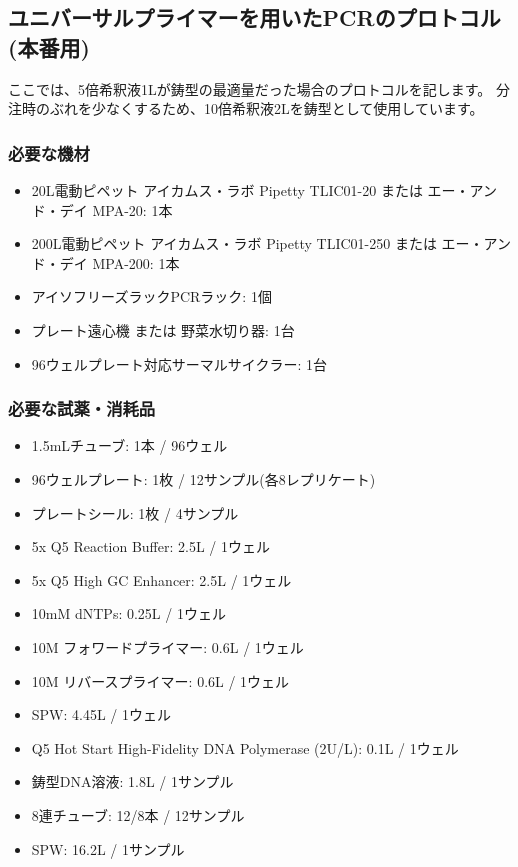 \documentclass[titlepage,10pt,a4paper,uplatex]{jsbook}
\begin{document}
\subsection{ユニバーサルプライマーを用いたPCRのプロトコル (本番用)}

ここでは、5倍希釈液1{\textmu}Lが鋳型の最適量だった場合のプロトコルを記します。
分注時のぶれを少なくするため、10倍希釈液2{\textmu}Lを鋳型として使用しています。

\subsubsection{必要な機材}
\begin{itemize}
\item 20{\textmu}L電動ピペット アイカムス・ラボ Pipetty TLIC01-20 または エー・アンド・デイ MPA-20: 1本
\item 200{\textmu}L電動ピペット アイカムス・ラボ Pipetty TLIC01-250 または エー・アンド・デイ MPA-200: 1本
\item アイソフリーズラックPCRラック: 1個
\item プレート遠心機 または 野菜水切り器: 1台
\item 96ウェルプレート対応サーマルサイクラー: 1台
\end{itemize}

\subsubsection{必要な試薬・消耗品}
\begin{itemize}
\item 1.5mLチューブ: 1本 / 96ウェル
\item 96ウェルプレート: 1枚 / 12サンプル(各8レプリケート)
\item プレートシール: 1枚 / 4サンプル
\item 5x Q5 Reaction Buffer: 2.5{\textmu}L / 1ウェル
\item 5x Q5 High GC Enhancer: 2.5{\textmu}L / 1ウェル
\item 10mM dNTPs: 0.25{\textmu}L / 1ウェル
\item 10{\textmu}M フォワードプライマー: 0.6{\textmu}L / 1ウェル
\item 10{\textmu}M リバースプライマー: 0.6{\textmu}L / 1ウェル
\item SPW: 4.45{\textmu}L / 1ウェル
\item Q5 Hot Start High-Fidelity DNA Polymerase (2U/{\textmu}L): 0.1{\textmu}L / 1ウェル
\item 鋳型DNA溶液: 1.8{\textmu}L / 1サンプル
\item 8連チューブ: 12/8本 / 12サンプル
\item SPW: 16.2{\textmu}L / 1サンプル
\end{itemize}
\end{document}
